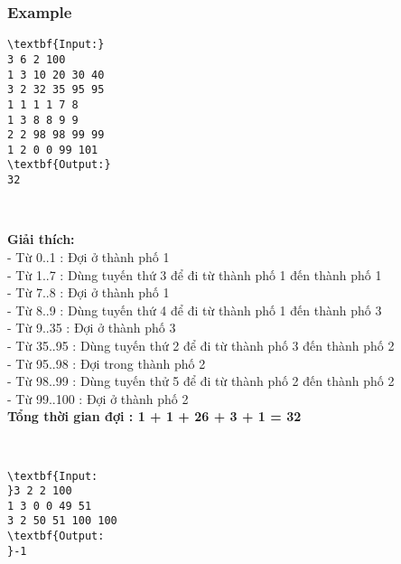 \subsubsection{Example}
\begin{verbatim}
\textbf{Input:}
3 6 2 100
1 3 10 20 30 40
3 2 32 35 95 95
1 1 1 1 7 8
1 3 8 8 9 9
2 2 98 98 99 99
1 2 0 0 99 101
\textbf{Output:}
32\end{verbatim}

 

\textbf{Giải thích:}
\\- Từ 0..1 : Đợi ở thành phố 1
\\- Từ 1..7 : Dùng tuyến thứ 3 để đi từ thành phố 1 đến thành phố 1
\\- Từ 7..8 : Đợi ở thành phố 1
\\- Từ 8..9 : Dùng tuyến thứ 4 để đi từ thành phố 1 đến thành phố 3
\\- Từ 9..35 : Đợi ở thành phố 3
\\- Từ 35..95 : Dùng tuyến thứ 2 để đi từ thành phố 3 đến thành phố 2
\\- Từ 95..98 : Đợi trong thành phố 2
\\- Từ 98..99 : Dùng tuyến thử 5 để đi từ thành phố 2 đến thành phố 2
\\- Từ 99..100 : Đợi ở thành phố 2
\\\textbf{Tổng thời gian đợi : 1 + 1 + 26 + 3 + 1 = 32}

 
\begin{verbatim}
\textbf{Input:
}3 2 2 100
1 3 0 0 49 51
3 2 50 51 100 100
\textbf{Output:
}-1
\end{verbatim}

 
